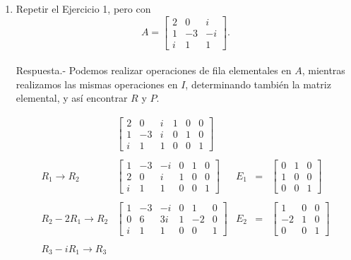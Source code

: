 \begin{enumerate}[\bfseries 1.]
    \item Repetir el Ejercicio 1, pero con
    $$
    A=
    \left[
	\begin{array}{*{3}{r}}
	    2 & 0 & i\\
	    1 & -3 & -i\\
	    i & 1 & 1
	\end{array}
    \right].
    $$\\

	Respuesta.-\; Podemos realizar operaciones de fila elementales en $A$, mientras realizamos las mismas operaciones en $I$, determinando también la matriz elemental, y así encontrar $R$ y $P$.

	$$
	\begin{array}{rlrcl}
	    &
	    \left[
		\begin{array}{rrr|rrr}
		    2 & 0 & i &  1 & 0 & 0 \\
		    1 & -3 & i &  0 & 1 & 0 \\
		    i & 1 & 1 &  0 & 0 & 1
		\end{array}
	    \right]
	    &&&\\\\
	    R_1\to R_2&
	    \left[
		\begin{array}{rrr|rrr}
		    1 & -3 & -i &  0 & 1 & 0 \\
		    2 & 0 & i &  1 & 0 & 0 \\
		    i & 1 & 1 &  0 & 0 & 1
		\end{array}
	    \right]
	    &E_1&=&
	    \left[
		\begin{array}{rrr}
		    0&1&0\\
		    1&0&0\\
		    0&0&1
		\end{array}
	    \right]\\\\
	    R_2-2R_1\to R_2&
	    \left[
		\begin{array}{rrr|rrr}
		    1 & -3 & -i &  0 & 1 & 0 \\
		    0 & 6 & 3i &  1 & -2 & 0 \\
		    i & 1 & 1 &  0 & 0 & 1
		\end{array}
	    \right]
	    &E_2&=&
	    \left[
		\begin{array}{rrr}
		    1&0&0\\
		    -2&1&0\\
		    0&0&1
		\end{array}
	    \right]\\\\
	    R_3-iR_1\to R_3&

\end{array}$$
\end{enumerate}
